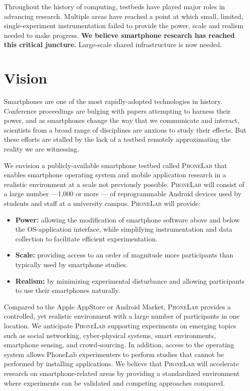 \pagestyle{empty}
Throughout the history of computing, testbeds have played major roles in
advancing research. Multiple areas have reached a point at which small,
limited, single-experiment instrumentation failed to provide the power, scale
and realism needed to make progress. \textbf{We believe smartphone research
has reached this critical juncture.} Large-scale shared infrastructure is now
needed.

\section{Vision}

Smartphones are one of the most rapidly-adopted technologies in history.
Conference proceedings are bulging with papers attempting to harness their
power, and as smartphones change the way that we communicate and interact,
scientists from a broad range of disciplines are anxious to study their
effects. But these efforts are stalled by the lack of a testbed remotely
approximating the reality we are witnessing.

We envision a publicly-available smartphone testbed called {\scshape
PhoneLab} that enables smartphone operating system and mobile application
research in a realistic environment at a scale not previously possible.
{\scshape PhoneLab} will consist of a large number ---1,000 or more --- of
reprogrammable Android devices used by students and staff at a university
campus. {\scshape PhoneLab} will provide:

\begin{itemize}

\item \textbf{Power:} allowing the modification of smartphone software above
and below the OS-application interface, while simplifying instrumentation and
data collection to facilitate efficient experimentation.

\item \textbf{Scale:} providing access to an order of magnitude more
participants than typically used by smartphone studies.

\item \textbf{Realism:} by minimizing experimental disturbance and allowing
participants to use their smartphones naturally.

\end{itemize}

Compared to the Apple AppStore or Android Market, {\scshape PhoneLab}
provides a controlled, yet realistic environment with a large number of
participants in one location. We anticipate {\scshape PhoneLab} supporting
experiments on emerging topics such as social networking, cyber-physical
systems, smart environments, smartphone sensing, and crowd-sourcing. In
addition, access to the operating system allows PhoneLab experimenters to
perform studies that cannot be performed by installing applications. We
believe that {\scshape PhoneLab} will accelerate research on
smartphone-related areas by providing a standardized environment where
experiments can be validated and competing approaches compared.

